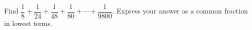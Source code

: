 Find $\dfrac{1}{8}+\dfrac{1}{24}+\dfrac{1}{48}+\dfrac{1}{80}+\cdots+\dfrac{1}{9800}$. Express your answer as a common fraction in lowest terms.
